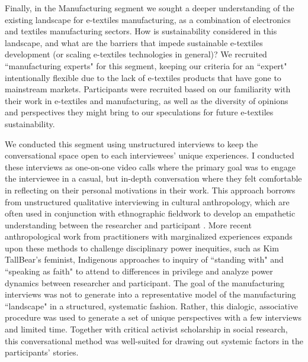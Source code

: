 Finally, in the Manufacturing segment we sought a deeper understanding of the existing landscape for e-textiles manufacturing, as a combination of electronics and textiles manufacturing sectors. How is sustainability considered in this landscape, and what are the barriers that impede sustainable e-textiles development (or scaling e-textiles technologies in general)? We recruited ``manufacturing experts" for this segment, keeping our criteria for an ``expert" intentionally flexible due to the lack of e-textiles products that have gone to mainstream markets. Participants were recruited based on our familiarity with their work in e-textiles and manufacturing, as well as the diversity of opinions and perspectives they might bring to our speculations for future e-textiles sustainability.

We conducted this segment using unstructured interviews to keep the conversational space open to each interviewees' unique experiences. I conducted these interviews as one-on-one video calls where the primary goal was to engage the interviewee in a casual, but in-depth conversation where they felt comfortable in reflecting on their personal motivations in their work. This approach borrows from unstructured qualitative interviewing in cultural anthropology, which are often used in conjunction with ethnographic fieldwork to develop an empathetic understanding between the researcher and participant \cite{fontana_interviewing_2007, gburgess_unstructured_1982}. More recent anthropological work from practitioners with marginalized experiences expands upon these methods to challenge disciplinary power inequities, such as Kim TallBear's feminist, Indigenous approaches to inquiry of ``standing with" and ``speaking as faith" \cite{tallbear_standing_2014} to attend to differences in privilege and analyze power dynamics between researcher and participant. 
The goal of the manufacturing interviews was not to generate into a representative model of the manufacturing ``landscape" in a structured, systematic fashion. Rather, this dialogic, associative procedure was used to generate a set of unique perspectives with a few interviews and limited time. Together with critical activist scholarship in social research, this conversational method was well-suited for drawing out systemic factors in the participants' stories.

